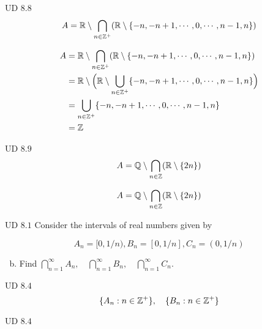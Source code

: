 \begin{frame}{}
  \begin{exampleblock}{UD $8.8$}
    \[
      A = \mathbb{R} \setminus \bigcap_{n \in \mathbb{Z}^{+}} (\mathbb{R} \setminus \{-n, -n+1, \cdots, 0, \cdots, n-1, n\})
    \]
  \end{exampleblock}

  \pause
  \begin{align*}
     A &= \mathbb{R} \setminus \bigcap_{n \in \mathbb{Z}^{+}} (\mathbb{R} \setminus \{-n, -n+1, \cdots, 0, \cdots, n-1, n\}) \\
       &= \mathbb{R} \setminus \Big(\mathbb{R} \setminus \bigcup_{n \in \mathbb{Z}^{+}} \{-n, -n+1, \cdots, 0, \cdots, n-1, n\}\Big) \\
       &= \bigcup_{n \in \mathbb{Z}^{+}} \{-n, -n+1, \cdots, 0, \cdots, n-1, n\} \\
       &= \mathbb{Z}
  \end{align*}
\end{frame}

\begin{frame}{}
  \begin{exampleblock}{UD $8.9$}
    \[
      A = \mathbb{Q} \setminus \bigcap_{n \in \mathbb{Z}} (\mathbb{R} \setminus \{2n\})
    \]
  \end{exampleblock}

  \pause
  \begin{align*}
     A &= \mathbb{Q} \setminus \bigcap_{n \in \mathbb{Z}} (\mathbb{R} \setminus \{2n\}) \\
  \end{align*}
\end{frame}

\begin{frame}{}
  \begin{exampleblock}{UD $8.1$}
    Consider the intervals of real numbers given by 

    \[
      A_n = [0, 1/n), B_n = [0, 1/n], C_n = (0, 1/n)
    \]

    \begin{enumerate}[(a)]
      \setcounter{enumi}{1}
      \item Find $\bigcap_{n=1}^{\infty} A_n, \quad \bigcap_{n=1}^{\infty} B_n, \quad \bigcap_{n=1}^{\infty} C_n$.
    \end{enumerate}
  \end{exampleblock}

  \pause
  \vspace{0.50cm}
  \begin{exampleblock}{UD $8.4$}
    \[
      \{A_n: n \in \mathbb{Z}^{+}\}, \quad \{B_n: n \in \mathbb{Z}^{+}\}
    \]
  \end{exampleblock}
\end{frame}

\begin{frame}{}
  \begin{exampleblock}{UD $8.4$}
  \end{exampleblock}
\end{frame}

